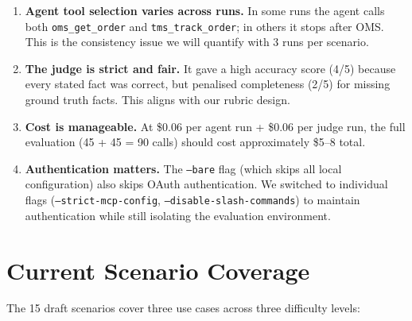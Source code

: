 \documentclass[11pt,a4paper]{article}
\begin{document}
\begin{enumerate}[itemsep=0.5em]
    \item \textbf{Agent tool selection varies across runs.} In some runs the agent calls both \texttt{oms\_get\_order} and \texttt{tms\_track\_order}; in others it stops after OMS. This is the consistency issue we will quantify with 3 runs per scenario.

    \item \textbf{The judge is strict and fair.} It gave a high accuracy score (4/5) because every stated fact was correct, but penalised completeness (2/5) for missing ground truth facts. This aligns with our rubric design.

    \item \textbf{Cost is manageable.} At \$0.06 per agent run + \$0.06 per judge run, the full evaluation (45 + 45 = 90 calls) should cost approximately \$5--8 total.

    \item \textbf{Authentication matters.} The \texttt{--bare} flag (which skips all local configuration) also skips OAuth authentication. We switched to individual flags (\texttt{--strict-mcp-config}, \texttt{--disable-slash-commands}) to maintain authentication while still isolating the evaluation environment.
\end{enumerate}

\section{Current Scenario Coverage}

The 15 draft scenarios cover three use cases across three difficulty levels:
\end{document}

